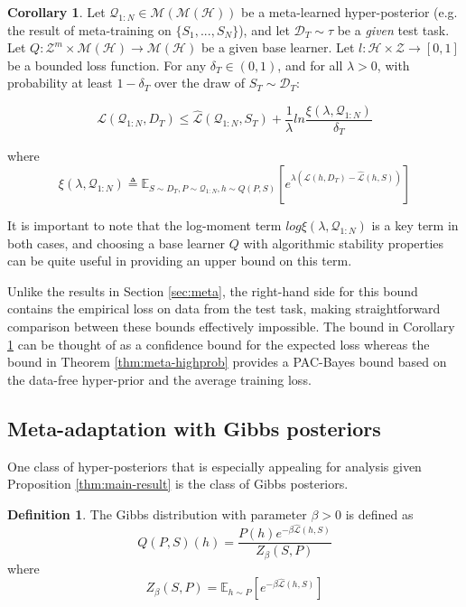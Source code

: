 \documentclass{article}
\theoremstyle{definition}
\newtheorem{defn}{Definition}[section]
\newtheorem{corollary}{Corollary}[section]
\newcommand{\Expect}[2]{\mathbb{E}_{#1}\left [#2 \right ]}
\begin{document}
\begin{corollary} \label{thm:corollary-base}
	Let $\mathcal{Q}_{1:N}\in \mathcal{M}(\mathcal{M}(\mathcal{H}))$ be a meta-learned hyper-posterior (e.g. the result of meta-training on $\{S_1,...,S_N\}$), and let $\mathcal{D}_T\sim \tau$ be a \emph{given} test task. Let $Q: \mathcal{Z}^m\times\mathcal{M}(\mathcal{H})\rightarrow \mathcal{M}(\mathcal{H})$ be a given base learner. Let $l: \mathcal{H}\times \mathcal{Z}\rightarrow [0, 1]$ be a bounded loss function.
	For any $\delta_T \in (0,1)$, and for all $\lambda>0$, with probability at least $1-\delta_T$ over the draw of $S_T\sim \mathcal{D}_T$:
	
	$$\mathcal{L}(\mathcal{Q}_{1:N}, D_T) \leq \hat{\mathcal{L}}(\mathcal{Q}_{1:N}, S_T)
	+\frac{1}{\lambda}ln\frac{\xi(\lambda,\mathcal{Q}_{1:N})}{\delta_T}$$
	
	where 
	$$\xi(\lambda,\mathcal{Q}_{1:N})\triangleq \Expect{S\sim D_T, P\sim \mathcal{Q}_{1:N}, h\sim Q(P,S)}{e^{\lambda\left (\mathcal{L}(h, D_T)-\hat{\mathcal{L}}(h, S)\right )}}$$
\end{corollary}

It is important to note that the log-moment term $log\xi(\lambda,\mathcal{Q}_{1:N})$ is a key term in both cases, and choosing a base learner $Q$ with algorithmic stability properties can be quite useful in providing an upper bound on this term.

Unlike the results in Section \ref{sec:meta}, the right-hand side for this bound contains the empirical loss on data from the test task, making straightforward comparison between these bounds effectively impossible. The bound in Corollary \ref{thm:corollary-base} can be thought of as a confidence bound for the expected loss whereas the bound in Theorem \ref{thm:meta-highprob} provides a PAC-Bayes bound based on the data-free hyper-prior and the average training loss.

\subsection{Meta-adaptation with Gibbs posteriors} \label{sec:adapt-gibbs}

One class of hyper-posteriors that is especially appealing for analysis given Proposition \ref{thm:main-result} is the class of Gibbs posteriors.

\begin{defn} \label{defn:Gibbs}
	The Gibbs distribution with parameter $\beta>0$ is defined as $$Q(P,S)(h)=\frac{P(h)e^{-\beta \hat{\mathcal{L}}(h,S)}}{Z_\beta(S,P)}$$ 
	where 
	$$Z_\beta(S,P)=\Expect{h\sim P}{e^{-\beta\hat{\mathcal{L}}(h,S)}}$$
\end{defn}
\end{document}
